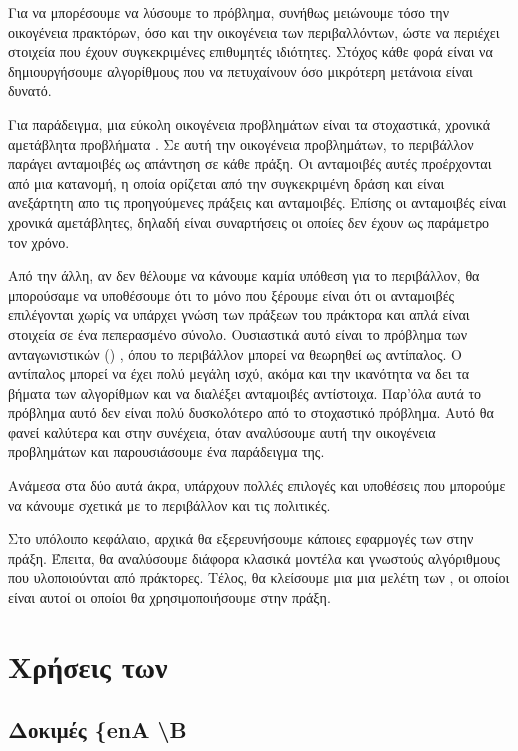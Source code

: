 Για να μπορέσουμε να λύσουμε το πρόβλημα, συνήθως μειώνουμε τόσο την οικογένεια πρακτόρων, όσο και την οικογένεια των περιβαλλόντων,
ώστε να περιέχει στοιχεία που έχουν συγκεκριμένες επιθυμητές ιδιότητες. Στόχος κάθε φορά είναι να δημιουργήσουμε αλγορίθμους που να
πετυχαίνουν όσο μικρότερη μετάνοια είναι δυνατό.

Για παράδειγμα, μια εύκολη οικογένεια προβλημάτων είναι τα στοχαστικά, χρονικά αμετάβλητα προβλήματα .
Σε αυτή την οικογένεια προβλημάτων, το περιβάλλον παράγει ανταμοιβές ως απάντηση σε κάθε πράξη. Οι ανταμοιβές αυτές προέρχονται από μια κατανομή,
η οποία ορίζεται από την συγκεκριμένη δράση και είναι ανεξάρτητη απο τις προηγούμενες πράξεις και ανταμοιβές.
Επίσης οι ανταμοιβές είναι χρονικά αμετάβλητες, δηλαδή είναι συναρτήσεις οι οποίες δεν έχουν ως παράμετρο τον χρόνο.

Από την άλλη, αν δεν θέλουμε να κάνουμε καμία υπόθεση για το περιβάλλον, θα μπορούσαμε να υποθέσουμε ότι το μόνο που ξέρουμε είναι ότι οι ανταμοιβές
επιλέγονται χωρίς να υπάρχει γνώση των πράξεων του πράκτορα και απλά είναι στοιχεία σε ένα πεπερασμένο σύνολο.
Ουσιαστικά αυτό είναι το πρόβλημα των ανταγωνιστικών () , όπου το περιβάλλον μπορεί να θεωρηθεί ως αντίπαλος.
Ο αντίπαλος μπορεί να έχει πολύ μεγάλη ισχύ, ακόμα και την ικανότητα να δει τα βήματα των αλγορίθμων και να διαλέξει ανταμοιβές αντίστοιχα.
Παρ'όλα αυτά το πρόβλημα αυτό δεν είναι πολύ δυσκολότερο από το στοχαστικό πρόβλημα. Αυτό θα φανεί καλύτερα και στην συνέχεια, όταν αναλύσουμε αυτή
την οικογένεια προβλημάτων και παρουσιάσουμε ένα παράδειγμα της.

Ανάμεσα στα δύο αυτά άκρα, υπάρχουν πολλές επιλογές και υποθέσεις που μπορούμε να κάνουμε σχετικά με το περιβάλλον και τις πολιτικές.

Στο υπόλοιπο κεφάλαιο, αρχικά θα εξερευνήσουμε κάποιες εφαρμογές των  στην πράξη. Έπειτα, θα αναλύσουμε διάφορα κλασικά μοντέλα  και
γνωστούς αλγόριθμους που υλοποιούνται από πράκτορες. Τέλος, θα κλείσουμε μια μια μελέτη των , οι οποίοι είναι αυτοί οι οποίοι θα χρησιμοποιήσουμε
στην πράξη.

\section{Χρήσεις των }

\subsection{Δοκιμές \{en{A \textbackslash B}}

